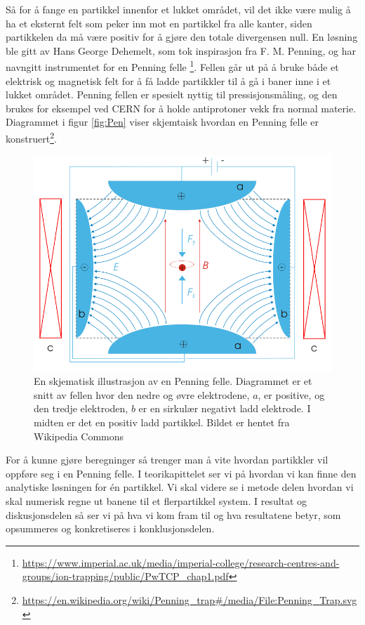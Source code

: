 \documentclass[reprint,english,notitlepage, nofootinbib]{revtex4-1}  %
\begin{document}
Så for å fange en partikkel innenfor et lukket området, vil det ikke være mulig å ha et eksternt felt som peker inn mot en partikkel fra alle kanter, siden partikkelen da må være positiv for å gjøre den totale divergensen null. En løsning ble gitt av Hans George Dehemelt, som tok inspirasjon fra F. M. Penning, og har navngitt instrumentet for en Penning felle \footnote{\url{https://www.imperial.ac.uk/media/imperial-college/research-centres-and-groups/ion-trapping/public/PwTCP_chap1.pdf}}. Fellen går ut på å bruke både et elektrisk og magnetisk felt for å få ladde partikkler til å gå i baner inne i et lukket området. Penning fellen er spesielt nyttig til pressisjonsmåling, og den brukes for eksempel ved CERN for å holde antiprotoner vekk fra normal materie. Diagrammet i figur \autoref{fig:Pen} viser skjemtaisk hvordan en Penning felle er konstruert\footnote{\url{https://en.wikipedia.org/wiki/Penning_trap\#/media/File:Penning_Trap.svg}}. 

\begin{figure}
\centering
\includegraphics[scale=0.27]{penning.png}
\caption{En skjematisk illustrasjon av en Penning felle. Diagrammet er et snitt av fellen hvor den nedre og øvre elektrodene, $a$, er positive, og den tredje elektroden, $b$ er en sirkulær negativt ladd elektrode. I midten er det en positiv ladd partikkel. Bildet er hentet fra Wikipedia Commons}
\label{fig:Pen}
\end{figure}

For å kunne gjøre beregninger så trenger man å vite hvordan partikkler vil oppføre seg i en Penning felle. I teorikapittelet ser vi på hvordan vi kan finne den analytiske løsningen for én partikkel. Vi skal videre se i metode delen hvordan vi skal numerisk regne ut banene til et flerpartikkel system. I resultat og diskusjonsdelen så ser vi på hva vi kom fram til og hva resultatene betyr, som opsummeres og konkretiseres i konklusjonsdelen.
\end{document}
